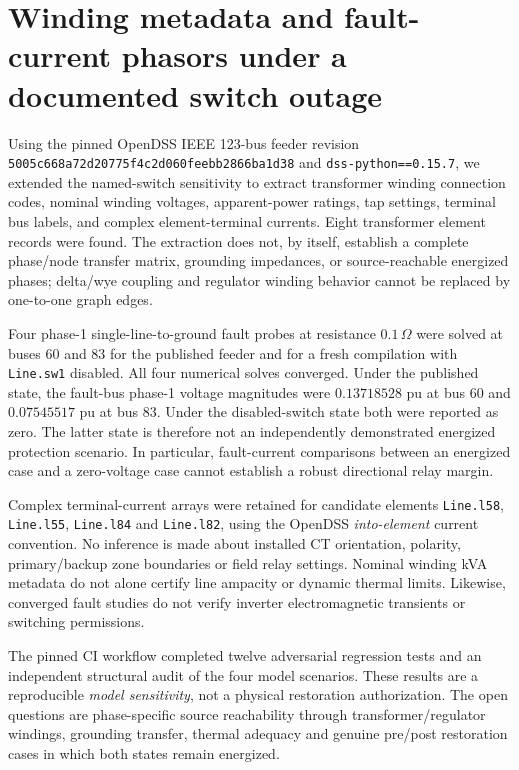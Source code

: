 \section{Winding metadata and fault-current phasors under a documented switch outage}
\label{sec:p16-winding-fault}
Using the pinned OpenDSS IEEE 123-bus feeder revision \texttt{5005c668a72d20775f4c2d060feebb2866ba1d38} and \texttt{dss-python==0.15.7}, we extended the named-switch sensitivity to extract transformer winding connection codes, nominal winding voltages, apparent-power ratings, tap settings, terminal bus labels, and complex element-terminal currents. Eight transformer element records were found. The extraction does not, by itself, establish a complete phase/node transfer matrix, grounding impedances, or source-reachable energized phases; delta/wye coupling and regulator winding behavior cannot be replaced by one-to-one graph edges.

Four phase-1 single-line-to-ground fault probes at resistance \(0.1\,\Omega\) were solved at buses 60 and 83 for the published feeder and for a fresh compilation with \texttt{Line.sw1} disabled. All four numerical solves converged. Under the published state, the fault-bus phase-1 voltage magnitudes were \(0.13718528\) pu at bus 60 and \(0.07545517\) pu at bus 83. Under the disabled-switch state both were reported as zero. The latter state is therefore not an independently demonstrated energized protection scenario. In particular, fault-current comparisons between an energized case and a zero-voltage case cannot establish a robust directional relay margin.

Complex terminal-current arrays were retained for candidate elements \texttt{Line.l58}, \texttt{Line.l55}, \texttt{Line.l84} and \texttt{Line.l82}, using the OpenDSS \emph{into-element} current convention. No inference is made about installed CT orientation, polarity, primary/backup zone boundaries or field relay settings. Nominal winding kVA metadata do not alone certify line ampacity or dynamic thermal limits. Likewise, converged fault studies do not verify inverter electromagnetic transients or switching permissions.

The pinned CI workflow completed twelve adversarial regression tests and an independent structural audit of the four model scenarios. These results are a reproducible \emph{model sensitivity}, not a physical restoration authorization. The open questions are phase-specific source reachability through transformer/regulator windings, grounding transfer, thermal adequacy and genuine pre/post restoration cases in which both states remain energized.